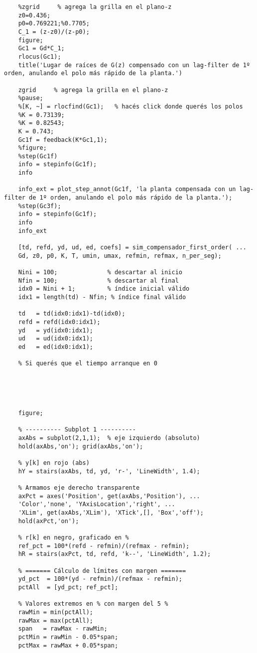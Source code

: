 \begin{lstlisting}[style=matlabstyle,caption={Primera hoja de cálculos utilizada.},label={matlab:calculo1}]
	%rlocus(Gd)
	%zgrid     % agrega la grilla en el plano-z
	z0=0.436;
	p0=0.769221;%0.7705;
	C_1 = (z-z0)/(z-p0);
	figure;
	Gc1 = Gd*C_1;
	rlocus(Gc1);
	title('Lugar de raíces de G(z) compensado con un lag-filter de 1º orden, anulando el polo más rápido de la planta.')
	
	zgrid     % agrega la grilla en el plano-z
	%pause;
	%[K, ~] = rlocfind(Gc1);   % hacés click donde querés los polos
	%K = 0.73139;
	%K = 0.82543;
	K = 0.743;
	Gc1f = feedback(K*Gc1,1);
	%figure;
	%step(Gc1f)
	info = stepinfo(Gc1f);
	info
	
	info_ext = plot_step_annot(Gc1f, 'la planta compensada con un lag-filter de 1º orden, anulando el polo más rápido de la planta.');
	%step(Gc3f);
	info = stepinfo(Gc1f);
	info
	info_ext
	
	[td, refd, yd, ud, ed, coefs] = sim_compensador_first_order( ...
	Gd, z0, p0, K, T, umin, umax, refmin, refmax, n_per_seg);
	
	Nini = 100;              % descartar al inicio
	Nfin = 100;              % descartar al final
	idx0 = Nini + 1;         % índice inicial válido
	idx1 = length(td) - Nfin; % índice final válido
	
	td   = td(idx0:idx1)-td(idx0);
	refd = refd(idx0:idx1);
	yd   = yd(idx0:idx1);
	ud   = ud(idx0:idx1);
	ed   = ed(idx0:idx1);
	
	% Si querés que el tiempo arranque en 0
	
	
	
	
	
	figure;
	
	% ---------- Subplot 1 ----------
	axAbs = subplot(2,1,1);  % eje izquierdo (absoluto)
	hold(axAbs,'on'); grid(axAbs,'on');
	
	% y[k] en rojo (abs)
	hY = stairs(axAbs, td, yd, 'r-', 'LineWidth', 1.4);
	
	% Armamos eje derecho transparente
	axPct = axes('Position', get(axAbs,'Position'), ...
	'Color','none', 'YAxisLocation','right', ...
	'XLim', get(axAbs,'XLim'), 'XTick',[], 'Box','off');
	hold(axPct,'on');
	
	% r[k] en negro, graficado en %
	ref_pct = 100*(refd - refmin)/(refmax - refmin);
	hR = stairs(axPct, td, refd, 'k--', 'LineWidth', 1.2);
	
	% ======= Cálculo de límites con margen =======
	yd_pct  = 100*(yd - refmin)/(refmax - refmin);
	pctAll  = [yd_pct; ref_pct];
	
	% Valores extremos en % con margen del 5 %
	rawMin = min(pctAll);
	rawMax = max(pctAll);
	span   = rawMax - rawMin;
	pctMin = rawMin - 0.05*span;
	pctMax = rawMax + 0.05*span;
	

\end{lstlisting}
